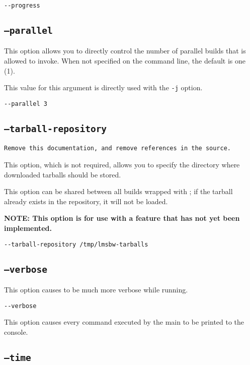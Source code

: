 \begin{verbatim}
--progress
\end{verbatim}

\subsection{\texttt{--parallel}}

This option allows you to directly control the number of parallel
builds that \make is allowed to invoke.  When not specified on the
command line, the default is one (1).

This value for this argument is directly used with the \gnumake
\texttt{-j} option.

\begin{verbatim}
--parallel 3
\end{verbatim}


\subsection{\texttt{--tarball-repository}}\texttt{Remove this
  documentation, and remove references in the source.}

This option, which is not required, allows you to specify the
directory where downloaded tarballs should be stored.

This option can be shared between all builds wrapped with \lmsbw; if
the tarball already exists in the repository, it will not be loaded.

\textbf{NOTE: This option is for use with a feature that has not yet
  been implemented.}

\begin{verbatim}
--tarball-repository /tmp/lmsbw-tarballs
\end{verbatim}

\subsection{\texttt{--verbose}}

This option causes \lmsbw to be much more verbose while running.

\begin{verbatim}
--verbose
\end{verbatim}

This option causes every command executed by the main \makefile to be
printed to the console.

\subsection{\texttt{--time}}


